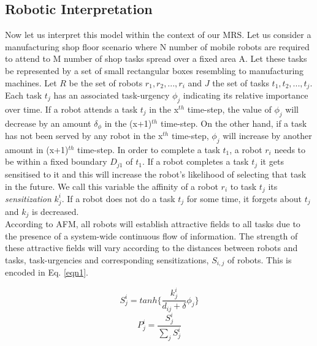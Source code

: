 \documentclass{llncs}
\begin{document}
\subsection{Robotic Interpretation}
Now let us interpret this model within the context of our MRS. Let us consider a manufacturing shop floor scenario where N number of mobile robots are required to attend to M number of shop tasks spread over a fixed area A.
Let these tasks be represented by a set of small rectangular boxes resembling to manufacturing machines.
Let $R$ be the set of robots ${r_1, r_2,...,r_i}$ and $J$ the set of tasks ${t_1, t_2,...,t_j}$.
Each task $t_j$ has an associated task-urgency $\phi_j$ indicating its relative importance over time.
If a robot attends a task $t_j$ in the x$^{th}$ time-step, the value of $\phi_j$ will decrease by an amount $\delta_\phi$ in the (x+1)$^{th}$ time-step.
On the other hand, if a task has not been served by any robot in the x$^{th}$ time-step, $\phi_j$ will increase by another amount in (x+1)$^{th}$ time-step.
In order to complete a task $t_1$, a robot $r_i$ needs to be within a fixed boundary $D_{j1}$ of $t_1$.
If a robot completes a task $t_j$ it gets sensitised to it and this will increase the robot's likelihood of selecting that task in the future.
We call this variable the affinity of a robot $r_i$ to task $t_j$ its {\em sensitization} $k_{j}^{i}$.
If a robot does not do a task $t_j$ for some time, it forgets about $t_j$ and $k_j$ is decreased.\\
According to AFM, all robots will establish attractive fields to all tasks due to the presence of a system-wide continuous flow of information.
The strength of these attractive fields will vary according to the distances between robots and tasks, task-urgencies and corresponding sensitizations, $S_{i,j}$ of robots. This is encoded in Eq. \ref{eqn1}.
\begin{small}
\begin{multicols}{2}
\begin{equation}
S_{j}^{i} = tanh\{\frac{k_{j}^{i}}{d_{ij}+\delta } \phi _{j}\}
\label{eqn1}
\end{equation}
\vspace*{0.25cm}
\begin{equation}
P_{j}^{i} = \frac{S_{j}^{i}}{\sum_{j}^{}S_{j}^{i}}
\label{eqn2}
\end{equation}
\end{multicols}
\end{small}
\end{document}
